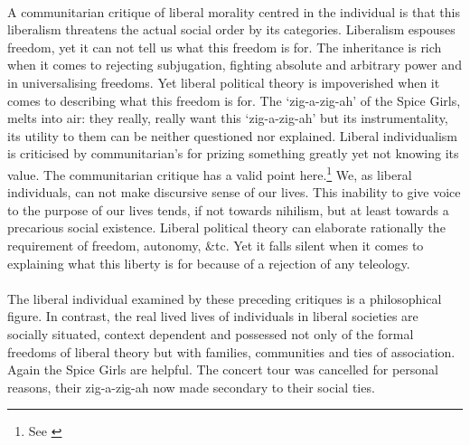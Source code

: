 \documentclass[12pt,a4paper,titlepage]{article}
\begin{document}
\paragraph{}A communitarian critique of liberal morality centred in the individual is that this liberalism threatens the actual social order by its categories. Liberalism espouses freedom, yet it can not tell us what this freedom is for. The inheritance is rich when it comes to rejecting subjugation, fighting absolute and arbitrary power and in universalising freedoms. Yet liberal political theory is impoverished when it comes to describing what this freedom is for. The `zig-a-zig-ah' of the Spice Girls, melts into air: they really, really want this `zig-a-zig-ah' but its instrumentality, its utility to them can be neither questioned nor explained. Liberal individualism is criticised by communitarian's for prizing something greatly yet not knowing its value. The communitarian critique has a valid point here.\footnote{See \cite[Ch. 11]{bellah:1985hh}} We, as liberal individuals, can not make discursive sense of our lives. This inability to give voice to the purpose of our lives tends, if not towards nihilism, but at least towards a precarious social existence. Liberal political theory can elaborate rationally the requirement of freedom, autonomy, \&tc. Yet it falls silent when it comes to explaining what this liberty is for because of a rejection of any teleology.

\paragraph{}The liberal individual examined by these preceding critiques is a philosophical figure. In contrast, the real lived lives of individuals in liberal societies are socially situated, context dependent and possessed not only of the formal freedoms of liberal theory but with families, communities and ties of association. Again the Spice Girls are helpful. The concert tour was cancelled for personal reasons, their zig-a-zig-ah now made secondary to their social ties.
\end{document}
